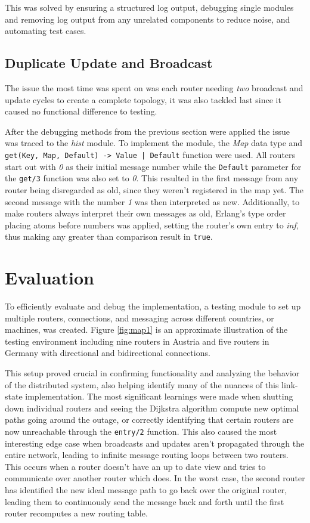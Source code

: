 \documentclass[a4paper, 11pt]{article}
\begin{document}
This was solved by ensuring a structured log output, debugging single modules and removing log output from any unrelated components to reduce noise, and automating test cases.

\subsection{Duplicate Update and Broadcast}

The issue the most time was spent on was each router needing \textit{two} broadcast and update cycles to create a complete topology, it was also tackled last since it caused no functional difference to testing.

After the debugging methods from the previous section were applied the issue was traced to the \textit{hist} module.
To implement the module, the \textit{Map} data type and \texttt{get(Key, Map, Default) -> Value | Default} function were used.
All routers start out with \textit{0} as their initial message number while the \texttt{Default} parameter for the \texttt{get/3} function was also set to \textit{0}.
This resulted in the first message from any router being disregarded as old, since they weren't registered in the map yet. The second message with the number \textit{1} was then interpreted as new.
Additionally, to make routers always interpret their own messages as old, Erlang's type order placing atoms before numbers was applied, setting the router's own entry to \textit{inf}, thus making any greater than comparison result in \texttt{true}.

\section{Evaluation}

To efficiently evaluate and debug the implementation, a testing module to set up multiple routers, connections, and messaging across different countries, or machines, was created.
Figure \ref{fig:map1} is an approximate illustration of the testing environment including nine routers in Austria and five routers in Germany with directional and bidirectional connections.

This setup proved crucial in confirming functionality and analyzing the behavior of the distributed system, also helping identify many of the nuances of this link-state implementation. 
The most significant learnings were made when shutting down individual routers and seeing the Dijkstra algorithm compute new optimal paths going around the outage, or correctly identifying that certain routers are now unreachable through the \texttt{entry/2} function.
This also caused the most interesting edge case when broadcasts and updates aren't propagated through the entire network, leading to infinite message routing loops between two routers.
This occurs when a router doesn't have an up to date view and tries to communicate over another router which does. In the worst case, the second router has identified the new ideal message path to go back over the original router, leading them to continuously send the message back and forth until the first router recomputes a new routing table.
\end{document}
